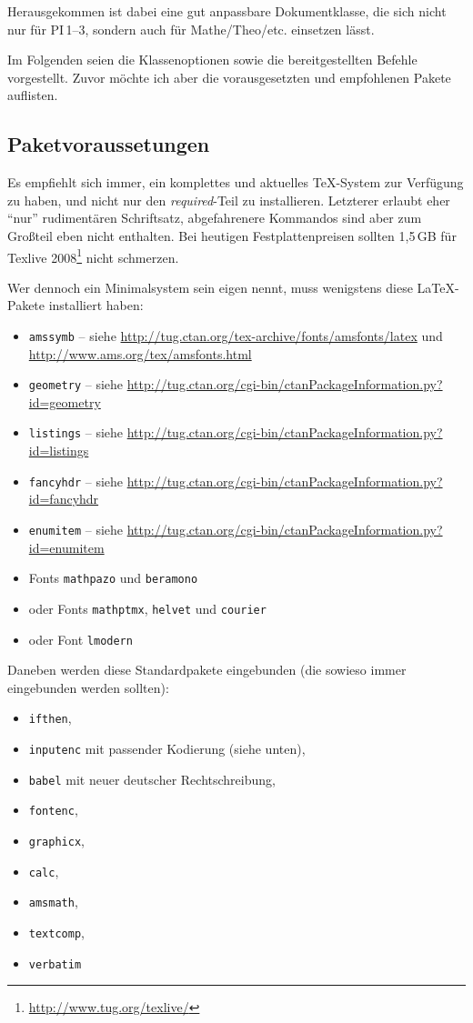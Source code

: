 \documentclass[nicefonts,nogruppe,nosemester,noveranstaltung,notutor,noabgabe,utf]{uhb-inf-tex}
\begin{document}
Herausgekommen ist dabei eine gut anpassbare Dokumentklasse, die sich nicht nur für PI\,1--3, sondern auch für Mathe/Theo/etc. einsetzen lässt.

Im Folgenden seien die Klassenoptionen sowie die bereitgestellten Befehle vorgestellt. Zuvor möchte ich aber die vorausgesetzten und empfohlenen Pakete auflisten.

\subsection{Paketvoraussetungen}

Es empfiehlt sich immer, ein komplettes und aktuelles \TeX-System zur Verfügung zu haben, und nicht nur den \textit{required}-Teil zu installieren. Letzterer erlaubt eher "`nur"' rudimentären Schriftsatz, abgefahrenere Kommandos sind aber zum Großteil eben nicht enthalten. Bei heutigen Festplattenpreisen sollten 1,5\,GB für Texlive 2008\footnote{\url{http://www.tug.org/texlive/}} nicht schmerzen.

Wer dennoch ein Minimalsystem sein eigen nennt, muss wenigstens diese \LaTeX-Pakete installiert haben:

\begin{itemize}
	\item \texttt{amssymb} -- siehe \url{http://tug.ctan.org/tex-archive/fonts/amsfonts/latex} und \url{http://www.ams.org/tex/amsfonts.html}
	\item \texttt{geometry} -- siehe \url{http://tug.ctan.org/cgi-bin/ctanPackageInformation.py?id=geometry}
	\item \texttt{listings} -- siehe \url{http://tug.ctan.org/cgi-bin/ctanPackageInformation.py?id=listings}
	\item \texttt{fancyhdr} -- siehe \url{http://tug.ctan.org/cgi-bin/ctanPackageInformation.py?id=fancyhdr}
	\item \texttt{enumitem} -- siehe \url{http://tug.ctan.org/cgi-bin/ctanPackageInformation.py?id=enumitem}
	\item Fonts \texttt{mathpazo} und \texttt{beramono}
	\item oder Fonts \texttt{mathptmx}, \texttt{helvet} und \texttt{courier}
	\item oder Font \texttt{lmodern}
\end{itemize}

Daneben werden diese Standardpakete eingebunden (die sowieso immer eingebunden werden sollten):

\begin{itemize}
	\item \texttt{ifthen},
	\item \texttt{inputenc} mit passender Kodierung (siehe unten),
	\item \texttt{babel} mit neuer deutscher Rechtschreibung,
	\item \texttt{fontenc},
	\item \texttt{graphicx},
	\item \texttt{calc},
	\item \texttt{amsmath},
	\item \texttt{textcomp},
	\item \texttt{verbatim}
\end{itemize}
\end{document}
